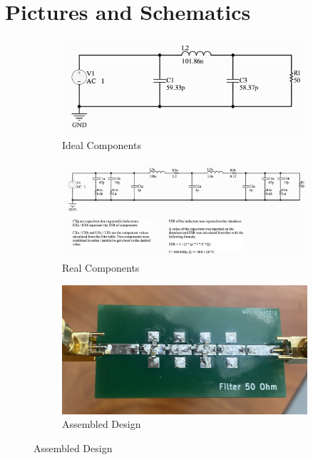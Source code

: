 \documentclass[letterpaper,12pt]{article}
\begin{document}
\newpage
\section{Pictures and Schematics}
\begin{figure}[H]
    \begin{subfigure}[t]{0.8\textwidth}
        \centering
        \includegraphics[width=\linewidth]{figures/2.ideal_components}
        \caption{Ideal Components}
    \end{subfigure}

    \medskip

    \begin{subfigure}[t]{0.8\textwidth}
        \centering
        \includegraphics[width=\linewidth]{figures/2.real_components}
        \caption{Real Components}
    \end{subfigure}

    \medskip

    \begin{subfigure}[t]{0.8\textwidth}
        \centering
        \includegraphics[width=\linewidth]{figures/2.assembled}
        \caption{Assembled Design}
    \end{subfigure}
\end{figure}
\end{document}
